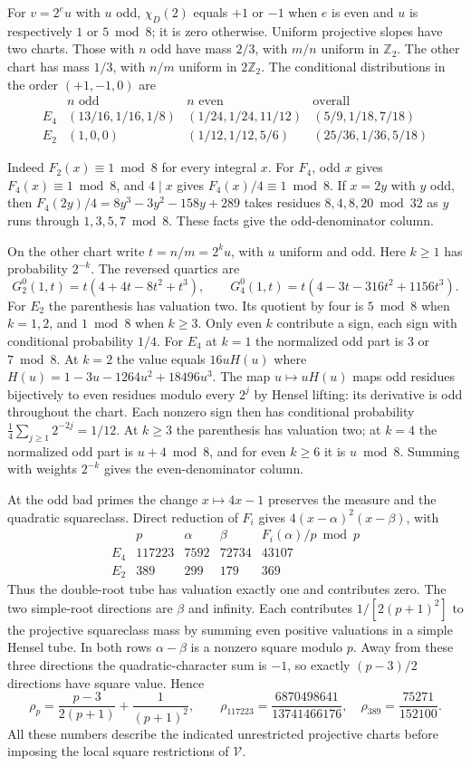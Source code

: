 \documentclass[11pt]{article}
\newcommand{\Z}{\mathbb{Z}}
\newcommand{\calV}{\mathcal{V}}
\begin{document}
For $v=2^eu$ with $u$ odd, $\chi_D(2)$ equals $+1$ or $-1$
when $e$ is even and $u$ is respectively $1$ or $5\bmod8$; it is
zero otherwise. Uniform projective slopes have two charts. Those
with $n$ odd have mass $2/3$, with $m/n$ uniform in $\Z_2$.
The other chart has mass $1/3$, with $n/m$ uniform in $2\Z_2$.
The conditional distributions in the order $(+1,-1,0)$ are
\[
\begin{array}{c|c|c|c}
 & n\text{ odd}& n\text{ even}&\text{overall}\\ \hline
E_4&(13/16,1/16,1/8)&(1/24,1/24,11/12)&(5/9,1/18,7/18)\\
E_2&(1,0,0)&(1/12,1/12,5/6)&(25/36,1/36,5/18)
\end{array}
\]

Indeed $F_2(x)\equiv1\bmod8$ for every integral $x$. For $F_4$,
odd $x$ gives $F_4(x)\equiv1\bmod8$, and $4\mid x$ gives
$F_4(x)/4\equiv1\bmod8$. If $x=2y$ with $y$ odd, then
$F_4(2y)/4=8y^3-3y^2-158y+289$ takes residues $8,4,8,20\bmod32$
as $y$ runs through $1,3,5,7\bmod8$. These facts give the
odd-denominator column.

On the other chart write $t=n/m=2^ku$, with $u$ uniform and odd.
Here $k\ge1$ has probability $2^{-k}$. The reversed quartics are
\[
 G_2^0(1,t)=t(4+4t-8t^2+t^3),\qquad
 G_4^0(1,t)=t(4-3t-316t^2+1156t^3).
\]
For $E_2$ the parenthesis has valuation two. Its quotient by four
is $5\bmod8$ when $k=1,2$, and $1\bmod8$ when $k\ge3$.
Only even $k$ contribute a sign, each sign with conditional
probability $1/4$. For $E_4$ at $k=1$ the normalized odd part
is $3$ or $7\bmod8$. At $k=2$ the value equals $16uH(u)$ where
$H(u)=1-3u-1264u^2+18496u^3$. The map $u\mapsto uH(u)$ maps
odd residues bijectively to even residues modulo every $2^j$ by
Hensel lifting: its derivative is odd throughout the chart.
Each nonzero sign then has conditional probability
$\tfrac14\sum_{j\ge1}2^{-2j}=1/12$. At $k\ge3$ the parenthesis has
valuation two; at $k=4$ the normalized odd part is $u+4\bmod8$,
and for even $k\ge6$ it is $u\bmod8$. Summing with weights
$2^{-k}$ gives the even-denominator column.

At the odd bad primes the change $x\mapsto4x-1$ preserves the
measure and the quadratic squareclass. Direct reduction of $F_i$
gives $4(x-\alpha)^2(x-\beta)$, with
\[
 \begin{array}{c|r|r|r|r}
 &p&\alpha&\beta&F_i(\alpha)/p\bmod p\\ \hline
 E_4&117223&7592&72734&43107\\
 E_2&389&299&179&369
 \end{array}
\]
Thus the double-root tube has valuation exactly one and contributes
zero. The two simple-root directions are $\beta$ and infinity.
Each contributes $1/[2(p+1)^2]$ to the projective squareclass mass
by summing even positive valuations in a simple Hensel tube.
In both rows $\alpha-\beta$ is a nonzero square modulo $p$.
Away from these three directions the quadratic-character sum is
$-1$, so exactly $(p-3)/2$ directions have square value. Hence
\[
 \rho_p=\frac{p-3}{2(p+1)}+\frac1{(p+1)^2},\qquad
 \rho_{117223}=\frac{6870498641}{13741466176},\quad
 \rho_{389}=\frac{75271}{152100}.
\]
All these numbers describe the indicated unrestricted projective
charts before imposing the local square restrictions of $\calV$.
\end{document}
